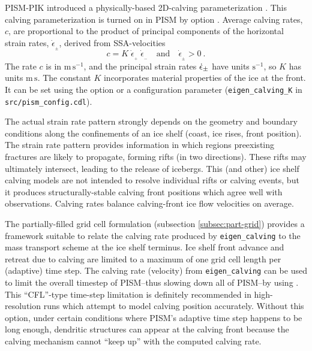 PISM-PIK introduced a physically-based 2D-calving parameterization \cite{Levermannetal2012}. This calving parameterization is turned on in PISM by option .  Average calving rates, $c$, are proportional to the product of principal components of the horizontal strain rates, $\dot{\epsilon}_{_\pm}$, derived from SSA-velocities 
\begin{equation}
\label{eq: calv2}
c = K\; \dot{\epsilon}_{_+}\; \dot{\epsilon}_{_-}\quad\text{and}\quad\dot{\epsilon}_{_\pm}>0\:.
\end{equation}
The rate $c$ is in $\text{m}\,\text{s}^{-1}$, and the principal strain rates $\dot{\epsilon}_\pm$ have units $\text{s}^{-1}$, so $K$ has units $\text{m}\,\text{s}$.  The constant $K$ incorporates material properties of the ice at the front.  It can be set using the  option or a configuration parameter (\texttt{eigen_calving_K} in \texttt{src/pism_config.cdl}).

The actual strain rate pattern strongly depends on the geometry and boundary conditions along the confinements of an ice shelf (coast, ice rises, front position).  The strain rate pattern provides information in which regions preexisting fractures are likely to propagate, forming rifts (in two directions).  These rifts may ultimately intersect, leading to the release of icebergs.  This (and other) ice shelf calving models are not intended to resolve individual rifts or calving events, but it produces structurally-stable calving front positions which agree well with observations.  Calving rates balance calving-front ice flow velocities on average.

The partially-filled grid cell formulation (subsection \ref{subsec:part-grid}) provides a framework suitable to relate the calving rate produced by \texttt{eigen_calving} to the mass transport scheme at the ice shelf terminus.  Ice shelf front advance and retreat due to calving are limited to a maximum of one grid cell length per (adaptive) time step.  The calving rate (velocity) from \texttt{eigen_calving} can be used to limit the overall timestep of PISM--thus slowing down all of PISM--by using .  This ``CFL''-type time-step limitation is definitely recommended in high-resolution runs which attempt to model calving position accurately.  Without this option, under certain conditions where PISM's adaptive time step happens to be long enough, dendritic structures can appear at the calving front because the calving mechanism cannot ``keep up'' with the computed calving rate.

